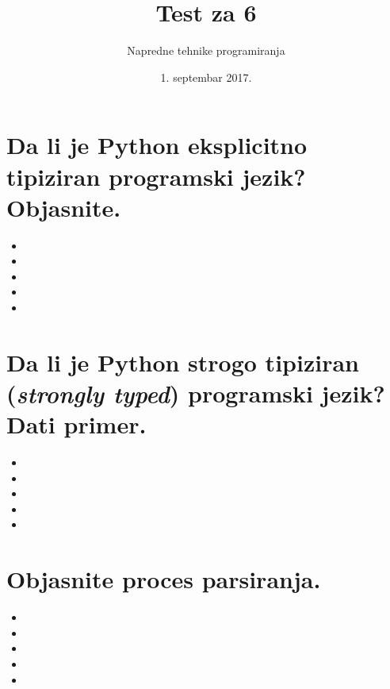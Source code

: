 \documentclass[11pt]{article}
\author{Napredne tehnike programiranja}
\date{1. septembar 2017.}
\title{Test za 6}
\begin{document}
\maketitle

\section{Da li je Python eksplicitno tipiziran programski jezik? Objasnite.}
\label{sec:orgba3175e}

\begin{itemize}
\item

\item

\item

\item

\item
\end{itemize}

\section{Da li je Python strogo tipiziran (\emph{strongly typed}) programski jezik? Dati primer.}
\label{sec:orgf2c0cf5}

\begin{itemize}
\item

\item

\item

\item

\item
\end{itemize}

\section{Objasnite proces parsiranja.}
\label{sec:org17df3b2}

\begin{itemize}
\item

\item

\item

\item

\item
\end{itemize}
\end{document}
